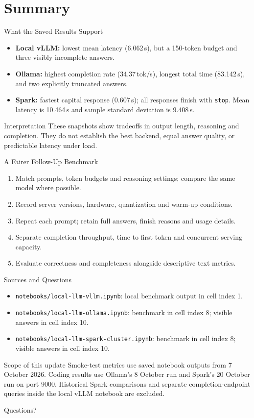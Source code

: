 \documentclass[aspectratio=169,12pt]{beamer}
\begin{document}
\section{Summary}
\begin{frame}{What the Saved Results Support}
\begin{itemize}
\item \textbf{Local vLLM:} lowest mean latency (6.062\,s), but a 150-token budget and three visibly incomplete answers.
\item \textbf{Ollama:} highest completion rate (34.37\,tok/s), longest total time (83.142\,s), and two explicitly truncated answers.
\item \textbf{Spark:} fastest capital response (0.607\,s); all responses finish with \texttt{stop}. Mean latency is 10.464\,s and sample standard deviation is 9.408\,s.
\end{itemize}
\begin{alertblock}{Interpretation}
These snapshots show tradeoffs in output length, reasoning and completion. They do not establish the best backend, equal answer quality, or predictable latency under load.
\end{alertblock}
\end{frame}
\begin{frame}{A Fairer Follow-Up Benchmark}
\begin{enumerate}
\item Match prompts, token budgets and reasoning settings; compare the same model where possible.
\item Record server versions, hardware, quantization and warm-up conditions.
\item Repeat each prompt; retain full answers, finish reasons and usage details.
\item Separate completion throughput, time to first token and concurrent serving capacity.
\item Evaluate correctness and completeness alongside descriptive text metrics.
\end{enumerate}
\end{frame}
\begin{frame}{Sources and Questions}
\small
\begin{itemize}
\item \texttt{notebooks/local-llm-vllm.ipynb}: local benchmark output in cell index 1.
\item \texttt{notebooks/local-llm-ollama.ipynb}: benchmark in cell index 8; visible answers in cell index 10.
\item \texttt{notebooks/local-llm-spark-cluster.ipynb}: benchmark in cell index 8; visible answers in cell index 10.
\end{itemize}
\begin{block}{Scope of this update}
Smoke-test metrics use saved notebook outputs from 7 October 2026. Coding results use Ollama's 8 October run and Spark's 20 October run on port 9000. Historical Spark comparisons and separate completion-endpoint queries inside the local vLLM notebook are excluded.
\end{block}
\vfill
\centering\Large Questions?
\end{frame}
\end{document}
